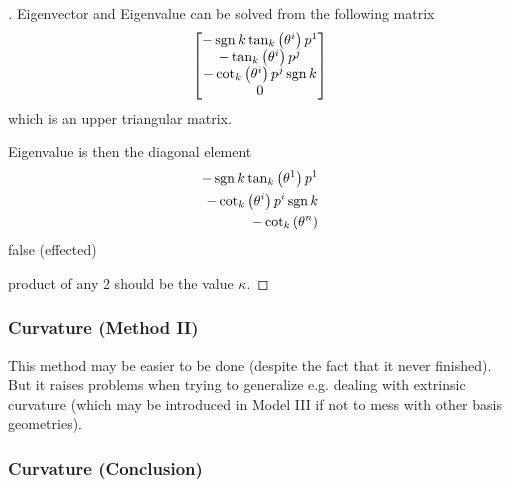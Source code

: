 \documentclass[stu, babel, american, biblatex, a4paper, draftall]{apa7}
\begin{document}
\begin{proof}[]
    \skipped

    Eigenvector and Eigenvalue can be solved from the following matrix
    \begin{align*}
        \begin{bmatrix}
            -\sign{k}\tan_k\left(\tensor{\theta}{^i}\right)\tensor{p}{^1} \\
            -\tan_k\left(\tensor{\theta}{^i}\right)\tensor{p}{^j}         \\
            -\cot_k\left(\tensor{\theta}{^i}\right)\tensor{p}{^j}\sign{k} \\
            0                                                             \\
        \end{bmatrix}
    \end{align*}
    which is an upper triangular matrix.

    Eigenvalue is then the diagonal element
    \begin{align*}
        -\sign{k}\tan_k\left(\tensor{\theta}{^1}\right)\tensor{p}{^1} \\
        -\cot_k\left(\tensor{\theta}{^i}\right)\tensor{p}{^i}\sign{k} \\
        -\cot_k\left(\tensor{\theta}{^n}\right)
    \end{align*}
    false (effected)

    product of any 2 should be the value $\kappa$.
\end{proof}
\subsubsection{Curvature (Method II)}
This method may be easier to be done
(despite the fact that it never finished).
But it raises problems when trying to generalize e.g. dealing with extrinsic curvature
(which may be introduced in Model III
if not to mess with other basis geometries).
\begin{lemma}\label{Model:ChristoffelSymbol}

\end{lemma}
\begin{lemma}\label{Model:RiemannCurvatureTensor}

\end{lemma}
\subsubsection{Curvature (Conclusion)}
\begin{lemma}\label{Model:SectionalCurvature}

\end{lemma}
\end{document}
